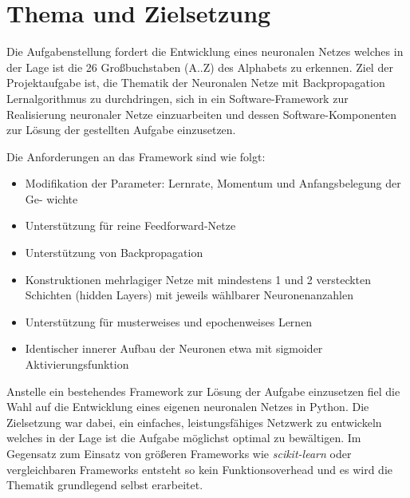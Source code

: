 \chapter{Thema und Zielsetzung}
\label{goal}
Die Aufgabenstellung fordert die Entwicklung eines neuronalen Netzes welches in der Lage ist die 26 Großbuchstaben (A..Z) des Alphabets zu erkennen. Ziel der Projektaufgabe ist, die Thematik der Neuronalen Netze mit Backpropagation Lernalgorithmus zu durchdringen, sich in ein Software-Framework zur Realisierung neuronaler Netze
einzuarbeiten und dessen Software-Komponenten zur Lösung der gestellten Aufgabe einzusetzen.

Die Anforderungen an das Framework sind wie folgt:
\begin{itemize}
\item Modifikation der Parameter: Lernrate, Momentum und Anfangsbelegung der Ge-
wichte
\item  Unterstützung für reine Feedforward-Netze
\item Unterstützung von Backpropagation
\item  Konstruktionen mehrlagiger Netze mit mindestens 1 und 2 versteckten Schichten
(hidden Layers) mit jeweils wählbarer Neuronenanzahlen
\item  Unterstützung für musterweises und epochenweises Lernen
\item  Identischer innerer Aufbau der Neuronen etwa mit sigmoider Aktivierungsfunktion
\end{itemize}

Anstelle ein bestehendes Framework zur Lösung der Aufgabe einzusetzen fiel die Wahl auf die Entwicklung eines eigenen neuronalen Netzes in Python. Die Zielsetzung war dabei, ein einfaches, leistungsfähiges Netzwerk zu entwickeln welches in der Lage ist die Aufgabe möglichst optimal zu bewältigen. Im Gegensatz zum Einsatz von größeren Frameworks wie \emph{scikit-learn} oder vergleichbaren Frameworks entsteht so kein Funktionsoverhead und es wird die Thematik grundlegend selbst erarbeitet.